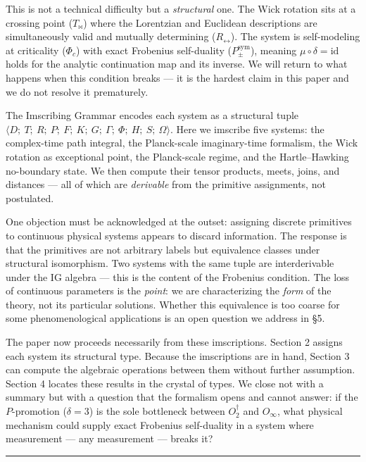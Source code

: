 \documentclass[12pt,a4paper]{article}
\newcommand{\pilcrow}{\S}
\begin{document}
This is not a technical difficulty but a \emph{structural} one. The Wick rotation sits at a crossing point ($T_{\bowtie}$) where the Lorentzian and Euclidean descriptions are simultaneously valid and mutually determining ($R_{\leftrightarrow}$). The system is self-modeling at criticality ($\Phi_c$) with exact Frobenius self-duality ($P_{\pm}^{\text{sym}}$), meaning $\mu \circ \delta = \text{id}$ holds for the analytic continuation map and its inverse. We will return to what happens when this condition breaks --- it is the hardest claim in this paper and we do not resolve it prematurely.

The Imscribing Grammar encodes each system as a structural tuple $\langle D;\ T;\ R;\ P;\ F;\ K;\ G;\ \Gamma;\ \Phi;\ H;\ S;\ \Omega \rangle$. Here we imscribe five systems: the complex-time path integral, the Planck-scale imaginary-time formalism, the Wick rotation as exceptional point, the Planck-scale regime, and the Hartle--Hawking no-boundary state. We then compute their tensor products, meets, joins, and distances --- all of which are \emph{derivable} from the primitive assignments, not postulated.

One objection must be acknowledged at the outset: assigning discrete primitives to continuous physical systems appears to discard information. The response is that the primitives are not arbitrary labels but equivalence classes under structural isomorphism. Two systems with the same tuple are interderivable under the IG algebra --- this is the content of the Frobenius condition. The loss of continuous parameters is the \emph{point}: we are characterizing the \emph{form} of the theory, not its particular solutions. Whether this equivalence is too coarse for some phenomenological applications is an open question we address in \pilcrow{}5.

The paper now proceeds necessarily from these imscriptions. Section 2 assigns each system its structural type. Because the imscriptions are in hand, Section 3 can compute the algebraic operations between them without further assumption. Section 4 locates these results in the crystal of types. We close not with a summary but with a question that the formalism opens and cannot answer: if the $P$-promotion ($\delta = 3$) is the sole bottleneck between $O_2^\dagger$ and $O_{\infty}$, what physical mechanism could supply exact Frobenius self-duality in a system where measurement --- any measurement --- breaks it?

\begin{center}
\rule{0.5\textwidth}{0.4pt}
\end{center}
\end{document}
